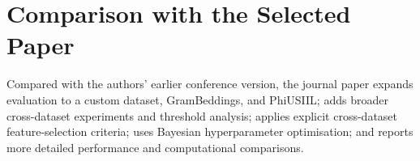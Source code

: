 \section{Comparison with the Selected Paper}
Compared with the authors' earlier conference version, the journal paper expands evaluation to a custom dataset, GramBeddings, and PhiUSIIL; adds broader cross-dataset experiments and threshold analysis; applies explicit cross-dataset feature-selection criteria; uses Bayesian hyperparameter optimisation; and reports more detailed performance and computational comparisons.\cite{bib1}
